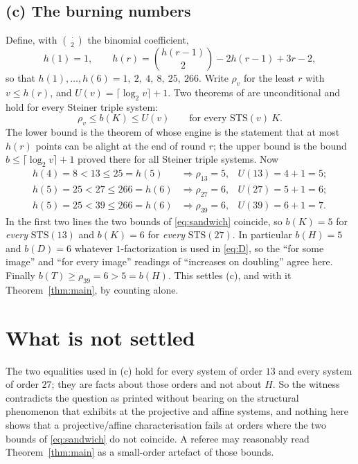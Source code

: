 \documentclass[11pt]{amsart}
\newcommand{\STS}{\mathrm{STS}}
\begin{document}
\subsection*{(c) The burning numbers}
Define, with $\binom{\cdot}{2}$ the binomial coefficient,
\begin{equation}\label{eq:h}
  h(1)=1,\qquad h(r)=\binom{h(r-1)}{2}-2h(r-1)+3r-2 ,
\end{equation}
so that $h(1),\dots,h(6)=1,\ 2,\ 4,\ 8,\ 25,\ 266$. Write $\rho_v$ for the
least $r$ with $v\le h(r)$, and $U(v)=\lceil\log_2v\rceil+1$. Two theorems of
\cite{BDJMP} are unconditional and hold for every Steiner triple system:
\begin{equation}\label{eq:sandwich}
  \rho_v\le b(K)\le U(v)\qquad\text{for every }\STS(v)\ K .
\end{equation}
The lower bound is the theorem of \cite{BDJMP} whose engine is the statement
that at most $h(r)$ points can be alight at the end of round $r$; the upper
bound is the bound $b\le\lceil\log_2v\rceil+1$ proved there for all Steiner
triple systems. Now
\[
  \begin{array}{lll}
    h(4)=8<13\le25=h(5) &\Rightarrow \rho_{13}=5, & U(13)=4+1=5;\\
    h(5)=25<27\le266=h(6) &\Rightarrow \rho_{27}=6, & U(27)=5+1=6;\\
    h(5)=25<39\le266=h(6) &\Rightarrow \rho_{39}=6, & U(39)=6+1=7.
  \end{array}
\]
In the first two lines the two bounds of \eqref{eq:sandwich} coincide, so
$b(K)=5$ for \emph{every} $\STS(13)$ and $b(K)=6$ for \emph{every} $\STS(27)$.
In particular $b(H)=5$ and $b(D)=6$ whatever $1$-factorization is used in
\eqref{eq:D}, so the ``for some image'' and ``for every image'' readings of
``increases on doubling'' agree here. Finally $b(T)\ge\rho_{39}=6>5=b(H)$.
This settles (c), and with it Theorem~\ref{thm:main}, by counting alone.

\section{What is not settled}

The two equalities used in (c) hold for every system of order $13$ and every
system of order $27$; they are facts about those orders and not about $H$. So
the witness contradicts the question as printed without bearing on the
structural phenomenon that \cite{BDJMP} exhibits at the projective and affine
systems, and nothing here shows that a projective/affine characterisation
fails at orders where the two bounds of \eqref{eq:sandwich} do not coincide.
A referee may reasonably read Theorem~\ref{thm:main} as a small-order artefact
of those bounds.
\end{document}
